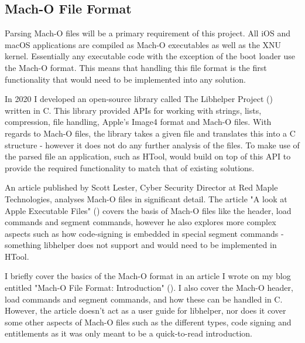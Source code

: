 \subsection{Mach-O File Format}


Parsing Mach-O files will be a primary requirement of this project. All iOS and macOS applications are compiled as Mach-O executables as well as the XNU kernel. Essentially any executable code with the exception of the boot loader use the Mach-O format. This means that handling this file format is the first functionality that would need to be implemented into any solution.




In 2020 I developed an open-source library called The Libhelper Project (\cite{h3adsh0tzz-libhelper}) written in C. This library provided APIs for working with strings, lists, compression, file handling, Apple's Image4 format and Mach-O files. With regards to Mach-O files, the library takes a given file and translates this into a C structure - however it does not do any further analysis of the files. To make use of the parsed file an application, such as HTool, would build on top of this API to provide the required functionality to match that of existing solutions.


An article published by Scott Lester, Cyber Security Director at Red Maple Technologies, analyses Mach-O files in significant detail. The article "A look at Apple Executable Files" (\cite{lester-macho}) covers the basis of Mach-O files like the header, load commands and segment commands, however he also explores more complex aspects such as how code-signing is embedded in special segment commands - something libhelper does not support and would need to be implemented in HTool.


I briefly cover the basics of the Mach-O format in an article I wrote on my blog entitled "Mach-O File Format: Introduction" (\cite{moulton-macho}). I also cover the Mach-O header, load commands and segment commands, and how these can be handled in C. However, the article doesn't act as a user guide for libhelper, nor does it cover some other aspects of Mach-O files such as the different types, code signing and entitlements as it was only meant to be a quick-to-read introduction.


